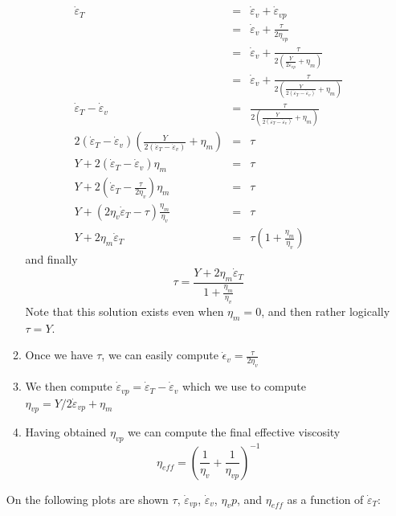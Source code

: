 \begin{itemize}
\begin{enumerate}
\begin{eqnarray}
\dot\varepsilon_T 
&=& \dot\varepsilon_v + \dot\varepsilon_{vp}  \nonumber\\
&=& \dot\varepsilon_v + \frac{\tau}{2 \eta_{vp}} \nonumber\\
&=& \dot\varepsilon_v + \frac{\tau}{2 \left( \frac{Y}{2\dot\varepsilon_{vp}} + \eta_m  \right)} \nonumber\\
&=& \dot\varepsilon_v + \frac{\tau}{2 \left( \frac{Y}{2(\dot\varepsilon_T-\dot\varepsilon_v)}+\eta_m\right)} \nonumber\\
\dot\varepsilon_T - \dot\varepsilon_v 
&=& \frac{\tau}{2 \left( \frac{Y}{2(\dot\varepsilon_T-\dot\varepsilon_v)}+\eta_m\right)} \nonumber\\
2 (\dot\varepsilon_T - \dot\varepsilon_v)
\left( \frac{Y}{2(\dot\varepsilon_T-\dot\varepsilon_v)}+\eta_m\right) &=& \tau \nonumber\\
Y +  2(\dot\varepsilon_T - \dot\varepsilon_v) \eta_m &=& \tau \nonumber\\
Y +  2(\dot\varepsilon_T - \frac{\tau}{2 \eta_v}) \eta_m &=& \tau \nonumber\\
Y +  (2\eta_v \dot\varepsilon_T - \tau) \frac{\eta_m}{\eta_v} &=& \tau \nonumber\\
Y +  2\eta_m \dot\varepsilon_T  &=& \tau (1 + \frac{\eta_m}{\eta_v} ) \nonumber
\end{eqnarray}
and finally 
\begin{equation}
\tau  = \frac{Y + 2 \eta_m \dot\varepsilon_T} {1+ \frac{\eta_m}{\eta_v} }
\end{equation}
Note that this solution exists even when $\eta_m=0$, and then rather logically $\tau=Y$.

\item Once we have $\tau$, we can easily compute $\dot\epsilon_v = \frac{\tau}{2\eta_v}$

\item We then compute $\dot\varepsilon_{vp} = \dot\varepsilon_T- \dot\varepsilon_v$ which 
we use to compute $\eta_{vp} = Y/2\dot\varepsilon_{vp}+\eta_m$

\item Having obtained $\eta_{vp}$ we can compute the final effective viscosity
\[
\eta_{eff} = \left( \frac{1}{\eta_v}  + \frac{1}{\eta_{vp}}  \right)^{-1}
\]
\end{enumerate}

On the following plots are shown $\tau$, 
$\dot\varepsilon_{vp}$, $\dot\varepsilon_v$, $\eta_vp$, and $\eta_{eff}$ 
as a function of  $\dot\varepsilon_T$: 


\end{itemize}
